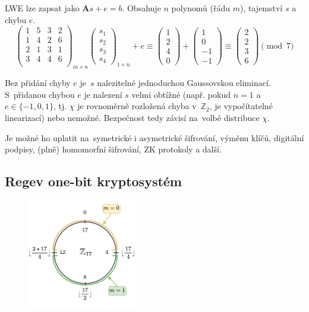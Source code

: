LWE lze zapsat jako $\textbf{A}s + e = b$. Obsahuje $n$ polynomů (řádu $m$), tajemství $s$ a chybu $e$.
$$
\left(
\begin{matrix}
1 & 5 & 3 & 2 \\
1 & 4 & 2 & 6 \\
2 & 1 & 3 & 1 \\
3 & 4 & 4 & 6 \\
\end{matrix}
\right)_{m \times n}
\left(
\begin{matrix}
s_1 \\ s_2 \\ s_3 \\ s_4
\end{matrix}
\right)_{1 \times n} + e
\equiv \left(
\begin{matrix}
1 \\ 2 \\ 4 \\ 0
\end{matrix}
\right) + \left(
\begin{matrix}
1 \\ 0 \\ -1 \\ -1
\end{matrix}
\right)
\equiv \left(
\begin{matrix}
2 \\ 2 \\ 3 \\ 6
\end{matrix}
\right) \pmod 7
$$

Bez přidání chyby $e$ je~$s$ nalezitelné jednoduchou Gaussovskou eliminací.
S~přidanou chybou $e$ je nalezení $s$ velmi obtížné (např. pokud $n=1$ a $e \in \{-1, 0, 1\}$, tj. $\chi$ je rovnoměrně rozložená chyba v~$\mathbb{Z}_2$, je vypočítatelné linearizací) nebo nemožné.
Bezpečnost tedy závisí na~volbě distribuce $\chi$.

Je možné ho uplatit na~symetrické i asymetrické šifrování, výměnu klíčů, digitální podpisy, (plně) homomorfní šifrování, ZK protokoly a další.


\subsection{Regev one-bit kryptosystém}

\begin{figure}[ht]
    \centering
    \includegraphics[width=13em]{regev}
\end{figure}

